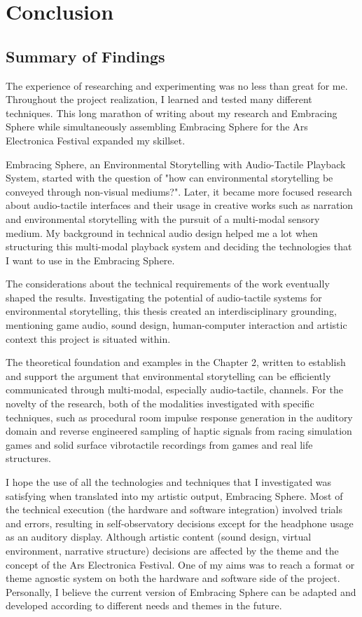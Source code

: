 \chapter{Conclusion}
    \section{Summary of Findings}
        The experience of researching and experimenting was no less than great for me. Throughout the project realization, I learned and tested many different techniques. This long marathon of writing about my research and Embracing Sphere while simultaneously assembling Embracing Sphere for the Ars Electronica Festival expanded my skillset.\par

        Embracing Sphere, an Environmental Storytelling with Audio-Tactile Playback System, started with the question of "how can environmental storytelling be conveyed through non-visual mediums?". Later, it became more focused research about audio-tactile interfaces and their usage in creative works such as narration and environmental storytelling with the pursuit of a multi-modal sensory medium. My background in technical audio design helped me a lot when structuring this multi-modal playback system and deciding the technologies that I want to use in the Embracing Sphere.\par

        The considerations about the technical requirements of the work eventually shaped the results. Investigating the potential of audio-tactile systems for environmental storytelling, this thesis created an interdisciplinary grounding, mentioning game audio, sound design, human-computer interaction and artistic context this project is situated within.\par

        The theoretical foundation and examples in the Chapter 2, written to establish and support the argument that environmental storytelling can be efficiently communicated through multi-modal, especially audio-tactile, channels. For the novelty of the research, both of the modalities investigated with specific techniques, such as procedural room impulse response generation in the auditory domain and reverse engineered sampling of haptic signals from racing simulation games and solid surface vibrotactile recordings from games and real life structures.\par

        I hope the use of all the technologies and techniques that I investigated was satisfying when translated into my artistic output, Embracing Sphere. Most of the technical execution (the hardware and software integration) involved trials and errors, resulting in self-observatory decisions except for the headphone usage as an auditory display. Although artistic content (sound design, virtual environment, narrative structure) decisions are affected by the theme and the concept of the Ars Electronica Festival. One of my aims was to reach a format or theme agnostic system on both the hardware and software side of the project. Personally, I believe the current version of Embracing Sphere can be adapted and developed according to different needs and themes in the future.\par
